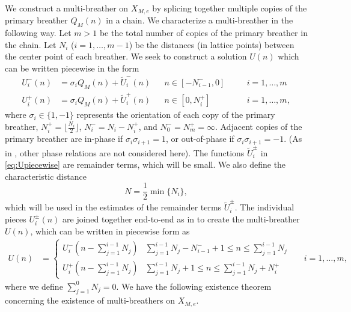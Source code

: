 \documentclass[12pt,reqno]{amsart}
\theoremstyle{definition}
\begin{document}
We construct a multi-breather on $X_{M,e}$ by splicing together multiple copies of the primary breather $Q_M(n)$ in a chain. We characterize a multi-breather in the following way. Let $m > 1$ be the total number of copies of the primary breather in the chain. Let $N_i$ ($i = 1, \dots, m-1$) be the distances (in lattice points) between the center point of each breather. We seek to construct a solution $U(n)$ which can be written piecewise in the form
\begin{equation}\label{eq:Upiecewise}
\begin{aligned}
U_i^-(n) &= \sigma_i Q_M(n) + \tilde{U}_i^-(n) && n \in [-N_{i-1}^-, 0] && \quad i = 1, \dots, m\\
U_i^+(n) &= \sigma_i Q_M(n) + \tilde{U}_i^+(n) && n \in [0, N_i^+] && \quad i = 1, \dots, m,
\end{aligned}
\end{equation}
where $\sigma_i \in \{1, -1\}$ represents the orientation of each copy of the primary breather, $N_i^+ = \lfloor \frac{N_i}{2} \rfloor$, $N_i^- = N_i - N_i^+$, and $N_0^- = N_m^+ = \infty$. Adjacent copies of the primary breather are in-phase if $\sigma_i \sigma_{i+1} = 1$, or out-of-phase if $\sigma_i \sigma_{i+1} = -1$. (As in \cite{Pelinovsky2012}, other phase relations are not considered here). The functions $\tilde{U}_i^\pm$ in \cref{eq:Upiecewise} are remainder terms, which will be small. We also define the characteristic distance
\begin{equation}\label{defN}
N = \frac{1}{2} \min\{ N_i \},
\end{equation}
which will be used in the estimates of the remainder terms $\tilde{U}_i^\pm$. The individual pieces $U_i^\pm(n)$ are joined together end-to-end as in \cites{Sandstede1998,Knobloch2000,Parker2020,Parker2021} to create the multi-breather $U(n)$, which can be written in piecewise form as
\begin{equation}
\begin{aligned}
U(n) &= \begin{cases}
U_i^-\left( n - \sum_{j=1}^{i-1}N_j \right) & \sum_{j=1}^{i-1}N_j - N_{i-1}^- + 1 \leq n \leq \sum_{j=1}^{i-1}N_j \\
U_i^+\left( n - \sum_{j=1}^{i-1}N_j \right) & \sum_{j=1}^{i-1}N_j + 1 \leq n \leq \sum_{j=1}^{i-1}N_j + N_i^+
\end{cases}
&& i = 1, \dots, m,
\end{aligned}
\end{equation}
where we define $\sum_{j=1}^0 N_j = 0$. We have the following existence theorem concerning the existence of multi-breathers on $X_{M,e}$. 
\end{document}
